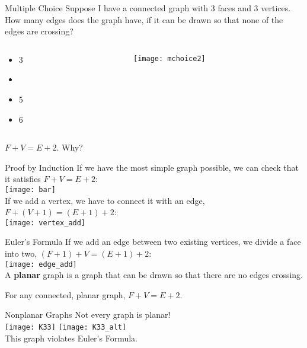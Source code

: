 \documentclass{beamer}
\begin{document}
\begin{frame}{Multiple Choice}
Suppose I have a connected graph with 3 faces and 3 vertices. How many edges does the graph have, if it can be drawn so that none of the edges are crossing?
\begin{columns}
\begin{column}{.5\textwidth}
\begin{itemize}
\item 3
\item  {}
\item 5
\item 6
\end{itemize}
\end{column}
\begin{column}{.5\textwidth}
\texttt{[image: mchoice2]}
\end{column}
\end{columns}
$F+V=E+2$. Why?
\end{frame}
\begin{frame}{Proof by Induction}
If we have the most simple graph possible, we can check that it satisfies $F+V=E+2$:\vspace*{.2cm}\\
\texttt{[image: bar]}\vspace*{.2cm}\\
If we add a vertex, we have to connect it with an edge, $F+(V+1)=(E+1)+2$:\vspace*{.2cm}\\
\texttt{[image: vertex\_add]}
\end{frame}
\begin{frame}{Euler's Formula}
If we add an edge between two existing vertices, we divide a face into two, $(F+1)+V=(E+1)+2$:\vspace*{.2cm}\\
\texttt{[image: edge\_add]}\vspace*{.2cm}\\
A \textbf{planar} graph is a graph that can be drawn so that there are no edges crossing.
\begin{theorem}[Euler] For any connected, planar graph, $F+V=E+2$.
\end{theorem}
\end{frame}
\begin{frame}{Nonplanar Graphs}
Not every graph is planar!\vspace*{.2cm}\\
\texttt{[image: K33]} \hfill \texttt{[image: K33\_alt]}\vspace*{.2cm}\\
This graph violates Euler's Formula.
\end{frame}
\end{document}
